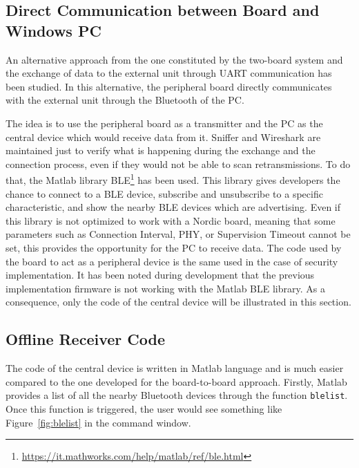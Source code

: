 \documentclass{Configuration_Files/PoliMi3i_thesis}
\begin{document}
\subsection{Direct Communication between Board and Windows PC}

An alternative approach from the one constituted by the two-board system and the exchange of data to the external unit through UART communication has been studied. In this alternative, the peripheral board directly communicates with the external unit through the Bluetooth of the PC.

The idea is to use the peripheral board as a transmitter and the PC as the central device which would receive data from it. Sniffer and Wireshark are maintained just to verify what is happening during the exchange and the connection process, even if they would not be able to scan retransmissions. To do that, the Matlab library BLE\footnote{\url{https://it.mathworks.com/help/matlab/ref/ble.html}} has been used. This library gives developers the chance to connect to a BLE device, subscribe and unsubscribe to a specific characteristic, and show the nearby BLE devices which are advertising. Even if this library is not optimized to work with a Nordic board, meaning that some parameters such as Connection Interval, PHY, or Supervision Timeout cannot be set, this provides the opportunity for the PC to receive data. The code used by the board to act as a peripheral device is the same used in the case of security implementation. It has been noted during development that the previous implementation firmware is not working with the Matlab BLE library. As a consequence, only the code of the central device will be illustrated in this section.

\subsection{Offline Receiver Code}

The code of the central device is written in Matlab language and is much easier compared to the one developed for the board-to-board approach. Firstly, Matlab provides a list of all the nearby Bluetooth devices through the function \texttt{blelist}. Once this function is triggered, the user would see something like Figure~\ref{fig:blelist} in the command window.
\end{document}
